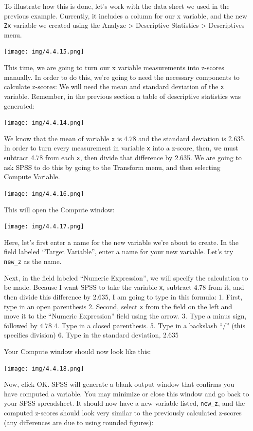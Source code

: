\documentclass[]{book}
\begin{document}
To illustrate how this is done, let's work with the data sheet we used
in the previous example. Currently, it includes a column for our x
variable, and the new \texttt{Zx} variable we created using the Analyze
\textgreater{} Descriptive Statistics \textgreater{} Descriptives menu.

\texttt{[image: img/4.4.15.png]}

This time, we are going to turn our x variable measurements into
z-scores manually. In order to do this, we're going to need the
necessary components to calculate z-scores: We will need the mean and
standard deviation of the \texttt{x} variable. Remember, in the previous
section a table of descriptive statistics was generated:

\texttt{[image: img/4.4.14.png]}

We know that the mean of variable \texttt{x} is 4.78 and the standard
deviation is 2.635. In order to turn every measurement in variable
\texttt{x} into a z-score, then, we must subtract 4.78 from each
\texttt{x}, then divide that difference by 2.635. We are going to ask
SPSS to do this by going to the {Transform} menu, and then selecting
{Compute Variable}.

\texttt{[image: img/4.4.16.png]}

This will open the Compute window:

\texttt{[image: img/4.4.17.png]}

Here, let's first enter a name for the new variable we're about to
create. In the field labeled ``Target Variable'', enter a name for your
new variable. Let's try \texttt{new\_z} as the name.

Next, in the field labeled ``Numeric Expression'', we will specify the
calculation to be made. Because I want SPSS to take the variable
\texttt{x}, subtract 4.78 from it, and then divide this difference by
2.635, I am going to type in this formula: 1. First, type in an open
parenthesis 2. Second, select \texttt{x} from the field on the left and
move it to the ``Numeric Expression'' field using the arrow. 3. Type a
minus sign, followed by 4.78 4. Type in a closed parenthesis. 5. Type in
a backslash ``/'' (this specifies division) 6. Type in the standard
deviation, 2.635

Your Compute window should now look like this:

\texttt{[image: img/4.4.18.png]}

Now, click {OK}. SPSS will generate a blank output window that confirms
you have computed a variable. You may minimize or close this window and
go back to your SPSS spreadsheet. It should now have a new variable
listed, \texttt{new\_z}, and the computed z-scores should look very
similar to the previously calculated z-scores (any differences are due
to using rounded figures):
\end{document}
